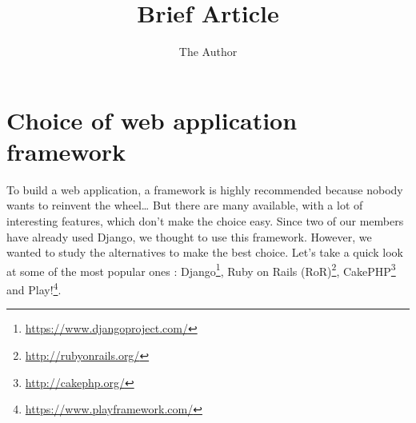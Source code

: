 \documentclass[11pt, a4paper]{article}   	%
\title{Brief Article}
\author{The Author}
\begin{document}

\section{Choice of web application framework}

To build a web application, a framework is highly recommended because nobody wants to reinvent the wheel\dots
But there are many available, with a lot of interesting features, which don't make the choice easy. Since two of our members have already used Django, we thought to use this framework. However, we wanted to study the alternatives to make the best choice. Let's take a quick look at some of the most popular ones : Django\footnote{\url{https://www.djangoproject.com/}}, Ruby on Rails (RoR)\footnote{\url{http://rubyonrails.org/}}, CakePHP\footnote{\url{http://cakephp.org/}} and Play!\footnote{\url{https://www.playframework.com/}}.
\end{document}
